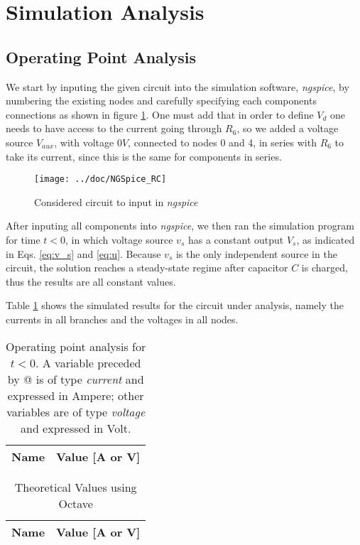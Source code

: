 \section{Simulation Analysis}
\label{sec:simulation}

\subsection{Operating Point Analysis}

We start by inputing the given circuit into the simulation software, \emph{ngspice}, by numbering the existing nodes and carefully specifying each components connections as shown in figure \ref{fig:NGS_RC}.
One must add that in order to define $V_d$ one needs to have access to the current going through $R_6$, so we added a voltage source $V_{aux}$, with voltage $0V$, connected to nodes 0 and 4, in series with $R_6$ to take its current, since this is the same for components in series.

\begin{figure}[H]
  \centering
  \texttt{[image: ../doc/NGSpice\_RC]}
  \caption{Considered circuit to input in \emph{ngspice}}
  \label{fig:NGS_RC}
\end{figure}

After inputing all components into \emph{ngspice}, we then ran the simulation program for time $t<0$, in which voltage source $v_s$ has a constant output $V_s$, as indicated in Eqs. \ref{eq:v_s} and \ref{eq:u}. Because $v_s$ is the only independent source in the circuit, the solution reaches a steady-state regime after capacitor $C$ is charged, thus the results are all constant values.


Table \ref{tab:ngspice_1} shows the simulated results for the circuit
under analysis, namely the currents in all branches and the voltages in all nodes.
\begin{multicols}{2}

\begin{table}[H]
  \centering
  \begin{tabular}{|l|r|}
    \hline
    {\bf Name} & {\bf Value [A or V]} \\ \hline
    
  \end{tabular}
  \caption{Operating point analysis for $t<0$. A variable preceded by @ is of type {\em current}
    and expressed in Ampere; other variables are of type {\it voltage} and expressed in
    Volt.}
  \label{tab:ngspice_1}
\end{table}

\begin{table}[H]
  \centering
  \begin{tabular}{|l|r|}
    \hline
    {\bf Name} & {\bf Value [A or V]} \\ \hline
    
  \end{tabular}
  \caption{Theoretical Values using Octave}
  \label{tab:alinea1_voltagens_tab_2}
\end{table}

\end{multicols}

